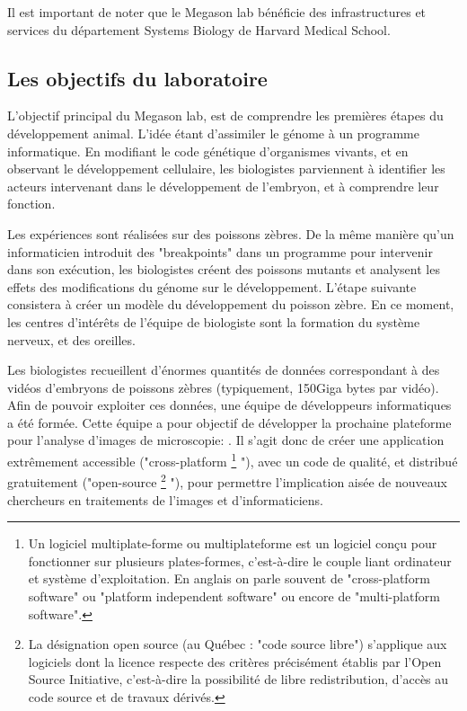 Il est important de noter que le Megason lab bénéficie des infrastructures et services du département Systems Biology de Harvard Medical School.


\subsection{Les objectifs du laboratoire}
L'objectif principal du Megason lab, est de comprendre les premières étapes du développement animal.
L'idée étant d'assimiler le génome à un programme informatique.
En modifiant le code génétique d'organismes vivants, et en observant le développement cellulaire,
les biologistes parviennent à identifier les acteurs intervenant dans le développement de l'embryon, et à comprendre leur fonction.

Les expériences sont réalisées sur des poissons zèbres.
De la même manière qu'un informaticien introduit des "breakpoints" dans un programme pour intervenir dans son exécution,
les biologistes créent des poissons mutants et analysent les effets des modifications du génome sur le développement.
L'étape suivante consistera à créer un modèle du développement du poisson zèbre.
En ce moment, les centres d'intérêts de l'équipe de biologiste sont la formation du système nerveux, et des oreilles.

Les biologistes recueillent d'énormes quantités de données
correspondant à des vidéos d'embryons de poissons zèbres (typiquement, 150Giga bytes par vidéo).
Afin de pouvoir exploiter ces données,
une équipe de développeurs informatiques a été formée.
Cette équipe a pour objectif de développer la prochaine plateforme
pour l'analyse d'images de microscopie: {\gofigure}.
Il s'agit donc de créer une application extrêmement accessible ("cross-platform
\footnote{Un logiciel multiplate-forme ou multiplateforme est un logiciel conçu pour fonctionner sur plusieurs plates-formes, c'est-à-dire le couple liant ordinateur et système d'exploitation. En anglais on parle souvent de "cross-platform software" ou "platform independent software" ou encore de "multi-platform software".}
"), 
avec un code de qualité,
et distribué gratuitement ("open-source
\footnote{La désignation open source (au Québec : "code source libre") s'applique aux logiciels dont la licence respecte des critères précisément établis par l'Open Source Initiative, c'est-à-dire la possibilité de libre redistribution, d'accès au code source et de travaux dérivés.}
"),
pour permettre l'implication aisée de nouveaux chercheurs
en traitements de l'images et d'informaticiens.

